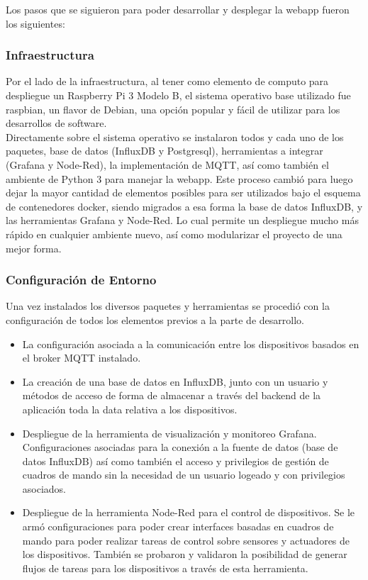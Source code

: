 Los pasos que se siguieron para poder desarrollar y desplegar la webapp fueron los siguientes:

\subsubsection{Infraestructura}
Por el lado de la infraestructura, al tener como elemento de computo para despliegue un Raspberry Pi 3 Modelo B, el sistema operativo base utilizado fue raspbian, un flavor de Debian, una opción popular y fácil de utilizar para los desarrollos de software.\\

Directamente sobre el sistema operativo se instalaron todos y cada uno de los paquetes, base de datos (InfluxDB y Postgresql), herramientas a integrar (Grafana y Node-Red), la implementación de MQTT, así como también el ambiente de Python 3 para manejar la webapp.  Este proceso cambió para luego dejar la mayor cantidad de elementos posibles para ser utilizados bajo el esquema de contenedores docker, siendo migrados a esa forma la base de datos InfluxDB, y las herramientas Grafana y Node-Red. Lo cual permite un despliegue mucho más rápido en cualquier ambiente nuevo, así como modularizar el proyecto de una mejor forma.

\subsubsection{Configuración de Entorno}
Una vez instalados los diversos paquetes y herramientas se procedió con la configuración de todos los elementos previos a la parte de desarrollo.
\begin{itemize}
\item La configuración asociada a la comunicación entre los dispositivos basados en el broker MQTT instalado. 
\item La creación de una base de datos en InfluxDB, junto con un usuario y métodos de acceso de forma de almacenar a través del backend de la aplicación toda la data relativa a los dispositivos. 
\item Despliegue de la herramienta de visualización y monitoreo Grafana. Configuraciones asociadas para la conexión a la fuente de datos (base de datos InfluxDB) así como también el acceso y privilegios de gestión de cuadros de mando sin la necesidad de un usuario logeado y con privilegios asociados.
\item Despliegue de la herramienta Node-Red para el control de dispositivos. Se le armó configuraciones para poder crear interfaces basadas en cuadros de mando para poder realizar tareas de control sobre sensores y actuadores de los dispositivos. También se probaron y validaron la posibilidad de generar flujos de tareas para los dispositivos a través de esta herramienta.
\end{itemize}

